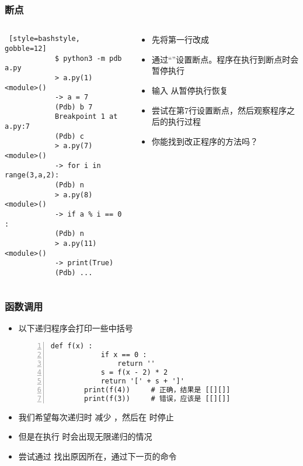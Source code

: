 \begin{frame} [fragile]
	\frametitle{断点}
	\begin{columns}[T]
		\begin{column}[T]{.5\textwidth}
			{\small
			\begin{lstlisting} [style=bashstyle, gobble=12]
			$ python3 -m pdb a.py
			> a.py(1)<module>()
			-> a = 7
			(Pdb) b 7
			Breakpoint 1 at a.py:7
			(Pdb) c
			> a.py(7)<module>()
			-> for i in range(3,a,2):
			(Pdb) n
			> a.py(8)<module>()
			-> if a % i == 0 :
			(Pdb) n
			> a.py(11)<module>()
			-> print(True)
			(Pdb) ...
			\end{lstlisting}
			}
		\end{column}
		\begin{column}[T]{.5\textwidth}
			\linespread{1.5}
			\begin{itemize}
			\item 先将第一行改成 
			\item 通过``''设置断点。程序在执行到断点时会暂停执行
			\item 输入  从暂停执行恢复
			\item 尝试在第7行设置断点，然后观察程序之后的执行过程
			\item 你能找到改正程序的方法吗？
			\end{itemize}
		\end{column}
	\end{columns}
\end{frame}

\begin{frame} [fragile]
	\frametitle{函数调用}
	\linespread{1.25}
	\begin{itemize}
	\item 以下递归程序会打印一些中括号
		{\small
		\begin{lstlisting}[style=pythonstyle, gobble=8, frame=single, 
							numbers=left, numberstyle=\ttfamily, texcl]
		def f(x) :
			if x == 0 :
				return ''
			s = f(x - 2) * 2
			return '[' + s + ']'
		print(f(4))		# 正确，结果是 [[][]]
		print(f(3))		# 错误，应该是 [[][]]
		\end{lstlisting}
		}
	\item 我们希望每次递归时  减少  ，然后在
		 时停止
	\item 但是在执行  时会出现无限递归的情况
	\item 尝试通过  找出原因所在，通过下一页的命令
	\end{itemize}
\end{frame}

